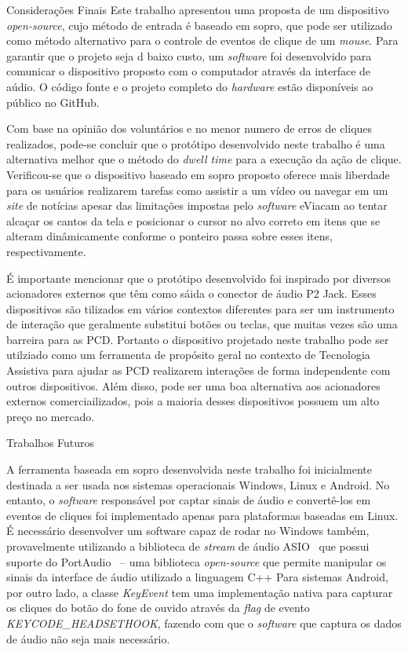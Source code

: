 \begin{chapter}{Considerações Finais}
Este trabalho apresentou uma proposta de um dispositivo \textit{open-source},
cujo método de entrada é baseado em sopro, que pode ser utilizado como método
alternativo para o controle de eventos de clique de um \textit{mouse}. Para
garantir que o projeto seja d baixo custo, um \textit{software} foi desenvolvido
para comunicar o dispositivo proposto com o computador através da interface de
aúdio. O código fonte e o projeto completo do \textit{hardware} estão
disponíveis ao público no GitHub.

Com base na opinião dos voluntários e no menor numero de erros de cliques
realizados, pode-se concluir que o protótipo desenvolvido neste trabalho é uma
alternativa melhor que o método do \textit{dwell time} para a execução da ação
de clique. Verificou-se que o dispositivo baseado em sopro proposto oferece mais
liberdade para os usuários realizarem tarefas como assistir a um vídeo ou navegar
em um \textit{site} de notícias apesar das limitações impostas pelo
\textit{software} eViacam ao tentar alcaçar os cantos da tela e posicionar o
cursor no alvo correto em itens que se alteram dinâmicamente conforme o ponteiro
passa sobre esses itens, respectivamente.

É importante mencionar que o protótipo desenvolvido foi inspirado por diversos
acionadores externos que têm como sáida o conector de áudio P2 Jack. Esses
dispositivos são tilizados em vários contextos diferentes para ser um
instrumento de interação que geralmente substitui botões ou teclas, que muitas
vezes são uma barreira para as PCD. Portanto o dispositivo projetado neste
trabalho pode ser utilziado como um ferramenta de propósito geral no contexto de
Tecnologia Assistiva para ajudar as PCD realizarem interações de forma
independente com outros dispositivos. Além disso, pode ser uma boa alternativa
aos acionadores externos comerciailizados, pois a maioria desses dispositivos
possuem um alto preço no mercado.

\begin{section}{Trabalhos Futuros}

A ferramenta baseada em sopro desenvolvida neste trabalho foi inicialmente
destinada a ser usada nos sistemas operacionais Windows, Linux e Android. No
entanto, o \textit{software} responsável por captar sinais de áudio e
convertê-los em eventos de cliques foi implementado apenas para plataformas
baseadas em Linux. É necessário desenvolver um software capaz de rodar no
Windows também, provavelmente utilizando a biblioteca de \textit{stream} de
áudio ASIO~\cite{asio} que possui suporte do PortAudio~\cite{portaudio} -- uma
biblioteca \textit{open-source} que permite manipular os sinais da interface de
áudio utilizado a linguagem C++	 Para sistemas Android, por outro lado, a classe
\emph{KeyEvent} tem uma implementação nativa para capturar os cliques do botão
do fone de ouvido através da \textit{flag} de evento
\emph{KEYCODE\_HEADSETHOOK}, fazendo com que o \textit{software} que captura os
dados de áudio não seja mais necessário.


\end{section}
\end{chapter}
